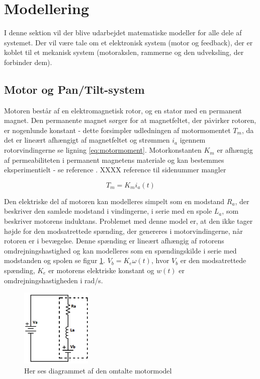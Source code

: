 \section{Modellering}\label{section:Modellering}
I denne sektion vil der blive udarbejdet matematiske modeller for alle dele af systemet. Der vil være tale om et elektronisk system (motor og feedback), der er koblet til et mekanisk system (motorakslen, rammerne og den udveksling, der forbinder dem). 

\subsection{Motor og Pan/Tilt-system}
Motoren består af en elektromagnetisk rotor, og en stator med en permanent magnet. Den permanente magnet sørger for at magnetfeltet, der påvirker rotoren, er nogenlunde konstant - dette forsimpler udledningen af motormomentet $T_{m}$, da det er lineært afhængigt af magnetfeltet og strømmen $i_{a}$ igennem rotorvindingerne se ligning \ref{eq:motormoment}. Motorkonstanten $K_{m}$ er afhængig af permeabiliteten i permanent magnetens materiale og kan bestemmes eksperimentielt - se reference \cite{azevedo2013}. XXXX reference til sidenummer mangler 

\begin{equation}\label{eq:motormoment}
T_{m}=K_{m}i_{a}(t)
\end{equation}

Den elektriske del af motoren kan modelleres simpelt som en modstand $R_{a}$, der beskriver den samlede modstand i vindingerne, i serie med en spole $L_{a}$, som beskriver motorens induktans. Problemet med denne model er, at den ikke tager højde for den modsatrettede spænding, der genereres i motorvindingerne, når rotoren er i bevægelse. Denne spænding er lineært afhængig af rotorens omdrejningshastighed og kan modelleres som en spændingskilde i serie med modstanden og spolen se figur \ref{fig:motor_sch}. $V_{b}=K_{e}\omega(t)$, hvor $V_{b}$ er den modsatrettede spænding, $K_{e}$ er motorens elektriske konstant og $w(t)$ er omdrejningshastigheden i rad/s.\\



\begin{figure}
	\centering
	\includegraphics[width=0.3\textwidth]{Billeder/Motormodel.png}
	\caption{Her ses diagrammet af den omtalte motormodel}
	\label{fig:motor_sch}
\end{figure}

